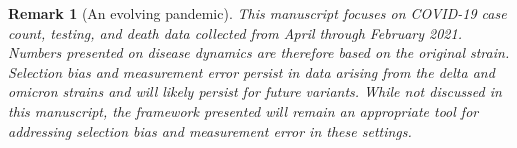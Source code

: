 \documentclass[11pt]{amsart}
\numberwithin{equation}{section}
\theoremstyle{plain}
\newtheorem{remark}{Remark}
\begin{document}
\begin{remark}[An evolving pandemic]
This manuscript focuses on COVID-19 case count, testing, and death data collected from April through February 2021.  Numbers presented on disease dynamics are therefore based on the original strain.  Selection bias and measurement error persist in data arising from the delta and omicron strains and will likely persist for future variants. While not discussed in this manuscript, the framework presented will remain an appropriate tool for addressing selection bias and measurement error in these settings.
\end{remark}





\end{document}
